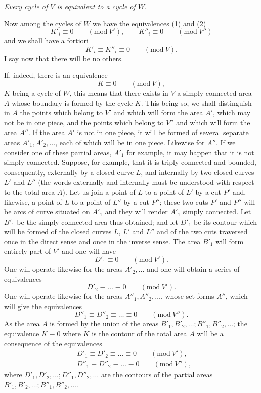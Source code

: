 \documentclass{article}
\begin{document}
\emph{Every cycle of $V$ is equivalent to a cycle of $W$}.

Now among the cycles of $W$ we have the equivalences (1) and (2)
\[ K'_{i} \equiv 0 \qquad (\text{mod}\ V'), \qquad K''_{i} \equiv 0 \qquad (\text{mod}\ V'') \]
and we shall have a fortiori
\[ K'_{i} \equiv K''_{i} \equiv 0 \qquad (\text{mod}\ V). \tag{3} \]
I say now that there will be no others.

If, indeed, there is an equivalence
\[ K \equiv 0 \qquad (\text{mod}\ V), \]
$K$ being a cycle of $W$, this means that there exists in $V$ a simply connected area $A$ whose boundary is formed by the cycle $K$. This being so, we shall distinguish in $A$ the points which belong to $V'$ and which will form the area $A'$, which may not be in one piece, and the points which belong to $V''$ and which will form the area $A''$. If the area $A'$ is not in one piece, it will be formed of several separate areas $A'_{1}, A'_{2}, \ldots$, each of which will be in one piece. Likewise for $A''$. If we consider one of these partial areas, $A'_{1}$ for example, it may happen that it is not simply connected. Suppose, for example, that it is triply connected and bounded, consequently, externally by a closed curve $L$, and internally by two closed curves $L'$ and $L''$ (the words externally and internally must be understood with respect to the total area $A$). Let us join a point of $L$ to a point of $L'$ by a cut $P'$ and, likewise, a point of $L$ to a point of $L''$ by a cut $P''$; these two cuts $P'$ and $P''$ will be arcs of curve situated on $A'_{1}$ and they will render $A'_{1}$ simply connected. Let $B'_{1}$ be the simply connected area thus obtained; and let $D'_{1}$ be its contour which will be formed of the closed curves $L$, $L'$ and $L''$ and of the two cuts traversed once in the direct sense and once in the inverse sense. The area $B'_{1}$ will form entirely part of $V'$ and one will have
\[ D'_{1} \equiv 0 \qquad (\text{mod}\ V'). \]
One will operate likewise for the areas $A'_{2}, \ldots$ and one will obtain a series of equivalences
\[ D'_{2} \equiv \ldots \equiv 0 \qquad (\text{mod}\ V'). \]
One will operate likewise for the areas $A''_{1}, A''_{2}, \ldots$, whose set forms $A''$, which will give the equivalences
\[ D''_{1} \equiv D''_{2} \equiv \ldots \equiv 0 \qquad (\text{mod}\ V''). \]
As the area $A$ is formed by the union of the areas $B'_{1}, B'_{2}, \ldots; B''_{1}, B''_{2}, \ldots$; the equivalence $K \equiv 0$ where $K$ is the contour of the total area $A$ will be a consequence of the equivalences
\[ \begin{aligned} &D'_{1} \equiv D'_{2} \equiv \ldots \equiv 0 \qquad (\text{mod}\ V'),\\ &D''_{1} \equiv D''_{2} \equiv \ldots \equiv 0 \qquad (\text{mod}\ V''), \end{aligned} \]
where $D'_{1}, D'_{2}, \ldots; D''_{1}, D''_{2}, \ldots$ are the contours of the partial areas $B'_{1}, B'_{2}, \ldots; B''_{1}, B''_{2}, \ldots$.
\end{document}
